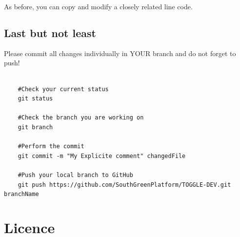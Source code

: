 \documentclass[a4paper,10pt]{report}
\begin{document}
As before, you can copy and modify a closely related line code.

\section{Last but not least}

Please commit all changes individually in YOUR branch and do not forget to push!

\begin{verbatim}
 
    #Check your current status
    git status

    #Check the branch you are working on
    git branch

    #Perform the commit
    git commit -m "My Explicite comment" changedFile

    #Push your local branch to GitHub
    git push https://github.com/SouthGreenPlatform/TOGGLE-DEV.git branchName

\end{verbatim}


\appendix

\chapter{Licence}
\end{document}
